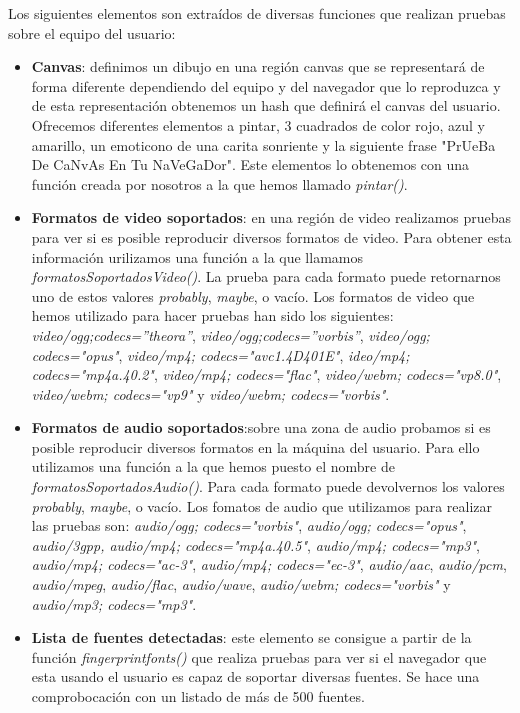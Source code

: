 \noindent  Los siguientes elementos son extraídos de diversas funciones que realizan pruebas sobre el equipo del usuario:
\begin{itemize} 
    \item \textbf{Canvas}: definimos un dibujo en una región canvas que se representará de forma diferente dependiendo del equipo y del navegador que lo reproduzca y de esta representación obtenemos un hash que definirá el canvas del usuario. Ofrecemos diferentes elementos a pintar, 3 cuadrados de color rojo, azul y amarillo, un emoticono de una carita sonriente y la siguiente frase "PrUeBa De CaNvAs En Tu NaVeGaDor". Este elementos lo obtenemos con una función creada por nosotros a la que hemos llamado \textit{pintar()}.
    \item \textbf{Formatos de video soportados}: en una región de video realizamos pruebas para ver si es posible reproducir diversos formatos de video. Para obtener esta información urilizamos una función a la que llamamos \textit{formatosSoportadosVideo()}. La prueba para cada formato puede retornarnos uno de estos valores \textit{probably}, \textit{maybe}, o vacío. Los formatos de video que hemos utilizado para hacer pruebas han sido los siguientes: \textit{video/ogg;codecs=”theora”}, \textit{video/ogg;codecs=”vorbis”}, \textit{video/ogg; codecs="opus"}, \textit{video/mp4; codecs="avc1.4D401E"}, \textit{ideo/mp4; codecs="mp4a.40.2"}, \textit{video/mp4; codecs="flac"}, \textit{video/webm; codecs="vp8.0"}, \textit{video/webm; codecs="vp9"} y \textit{video/webm; codecs="vorbis"}. 
    \item \textbf{Formatos de audio soportados}:sobre una zona de audio probamos si es posible reproducir diversos formatos en la máquina del usuario. Para ello utilizamos una función a la que hemos puesto el nombre de \textit{formatosSoportadosAudio()}. Para cada formato puede devolvernos los valores \textit{probably}, \textit{maybe}, o vacío. Los fomatos de audio que utilizamos para realizar las pruebas son: \textit{audio/ogg; codecs="vorbis"}, \textit{audio/ogg; codecs="opus"}, \textit{audio/3gpp, audio/mp4; codecs="mp4a.40.5"}, \textit{audio/mp4; codecs="mp3"}, \textit{audio/mp4; codecs="ac-3"}, \textit{audio/mp4; codecs="ec-3"}, \textit{audio/aac}, \textit{audio/pcm}, \textit{audio/mpeg}, \textit{audio/flac}, \textit{audio/wave}, \textit{audio/webm; codecs="vorbis"} y \textit{audio/mp3; codecs="mp3"}.
    \item \textbf{Lista de fuentes detectadas}: este elemento se consigue a partir de la función \textit{fingerprintfonts()} que realiza pruebas para ver si el navegador que esta usando el usuario es capaz de soportar diversas fuentes. Se hace una comprobocación con un listado de más de 500 fuentes.
\end{itemize}
